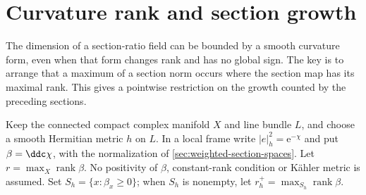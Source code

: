 \section{Curvature rank and section growth}
\label{sec:curvature-rank-section-growth}

The dimension of a section-ratio field can be bounded by a smooth curvature form, even when that form changes rank and has no global sign. The key is to arrange that a maximum of a section norm occurs where the section map has its maximal rank. This gives a pointwise restriction on the growth counted by the preceding sections.

Keep the connected compact complex manifold $X$ and line bundle $L$, and choose a smooth Hermitian metric $h$ on $L$. In a local frame write $|e|_h^2=\mathrm e^{-\chi}$ and put $\beta=\ddc\chi$, with the normalization of \cref{sec:weighted-section-spaces}. Let $r=\max_X\operatorname{rank}\beta$. No positivity of $\beta$, constant-rank condition or K\"ahler metric is assumed. Set $S_h=\{x:\beta_x\geq0\}$; when $S_h$ is nonempty, let $r_h^+=\max_{S_h}\operatorname{rank}\beta$.


